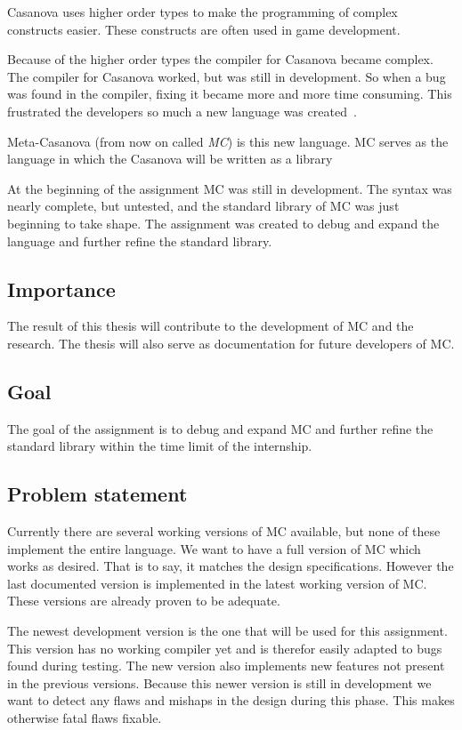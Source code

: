 Casanova uses higher order types to make the programming of complex constructs easier.
These constructs are often used in game development.

Because of the higher order types the compiler for Casanova became complex.
The compiler for Casanova worked, but was still in development.
So when a bug was found in the compiler, fixing it became more and more time consuming.
This frustrated the developers so much a new language was created~\cite{giuseppe2015mc}.

Meta-Casanova (from now on called \emph{MC}) is this new language.
MC serves as the language in which the Casanova will be written as a library

At the beginning of the assignment MC was still in development.
The syntax was nearly complete, but untested, and the standard library of MC was just beginning to take shape.
The assignment was created to debug and expand the language and further refine the standard library.


\subsection{Importance}
The result of this thesis will contribute to the development of MC and the research.
The thesis will also serve as documentation for future developers of MC.

\subsection{Goal}\label{sec:goalsmandate}
The goal of the assignment is to debug and expand MC and further refine the standard library within the time limit of the internship.

\subsection{Problem statement}
Currently there are several working versions of MC available, but none of these implement the entire language.
We want to have a full version of MC which works as desired.
That is to say, it matches the design specifications.
However the last documented version is implemented in the latest working version of MC.
These versions are already proven to be adequate\cite{giuseppe2015mc}.

The newest development version is the one that will be used for this assignment.
This version has no working compiler yet and is therefor easily adapted to bugs found during testing.
The new version also implements new features not present in the previous versions.
Because this newer version is still in development we want to detect any flaws and mishaps in the design during this phase.
This makes otherwise fatal flaws fixable.

